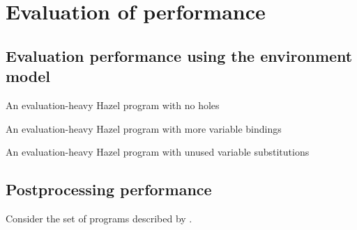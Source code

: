 \chapter{Evaluation of performance}
\label{sec:evaluation}

\section{Evaluation performance using the environment model}
\label{sec:evaluation-evalenv}


\begin{listing}
  \caption{An evaluation-heavy Hazel program with no holes}
  \label{fig:perf-fib}
\end{listing}


\begin{listing}
  \caption{An evaluation-heavy Hazel program with more variable bindings}
  \label{fig:perf-fib-more-bindings}
\end{listing}


\begin{listing}
  \caption{An evaluation-heavy Hazel program with unused variable substitutions}
  \label{fig:perf-fib-more-branches}
\end{listing}

\section{Postprocessing performance}
\label{sec:evaluation-renumbering}

Consider the set of programs described by .


